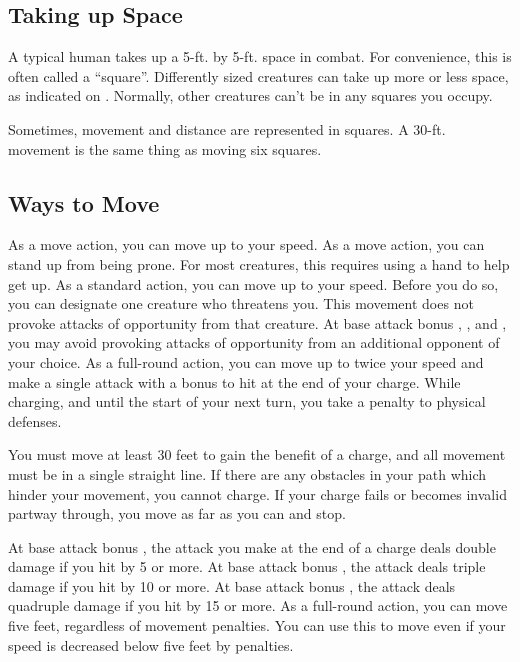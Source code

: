 \subsection{Taking up Space}
A typical human takes up a 5-ft. by 5-ft. space in combat. For convenience, this is often called a ``square''. Differently sized creatures can take up more or less space, as indicated on . Normally, other creatures can't be in any squares you occupy.

Sometimes, movement and distance are represented in squares. A 30-ft. movement is the same thing as moving six squares.

\subsection{Ways to Move}

 As a move action, you can move up to your speed.
 As a move action, you can stand up from being prone. For most creatures, this requires using a hand to help get up.
\label{Withdraw} As a standard action, you can move up to your speed. Before you do so, you can designate one creature who threatens you. This movement does not provoke attacks of opportunity from that creature. At base attack bonus , , and , you may avoid provoking attacks of opportunity from an additional opponent of your choice.
\label{Charge} As a full-round action, you can move up to twice your speed and make a single attack with a  bonus to hit at the end of your charge. While charging, and until the start of your next turn, you take a  penalty to physical defenses.
\par You must move at least 30 feet to gain the benefit of a charge, and all movement must be in a single straight line. If there are any obstacles in your path which hinder your movement, you cannot charge. If your charge fails or becomes invalid partway through, you move as far as you can and stop.
\par  At base attack bonus , the attack you make at the end of a charge deals double damage if you hit by 5 or more. At base attack bonus , the attack deals triple damage if you hit by 10 or more. At base attack bonus , the attack deals quadruple damage if you hit by 15 or more.
 As a full-round action, you can move five feet, regardless of movement penalties. You can use this to move even if your speed is decreased below five feet by penalties.

